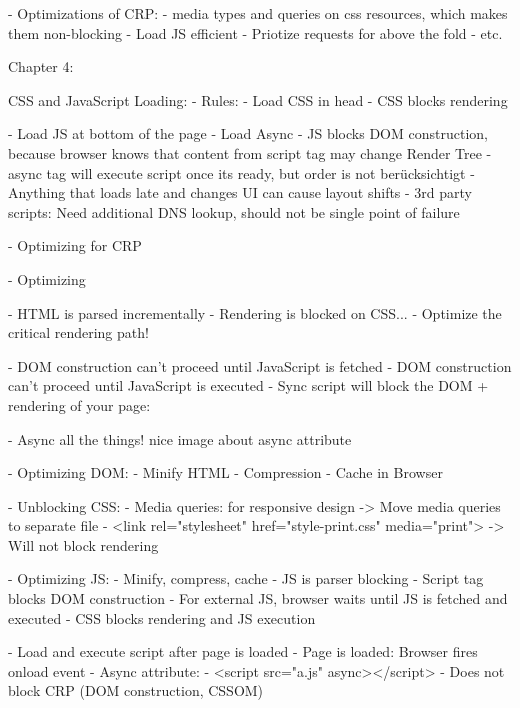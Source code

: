 - Optimizations of CRP:
- media types and queries on css resources, which makes them non-blocking
- Load JS efficient
- Priotize requests for above the fold
- etc. %

Chapter 4:

CSS and JavaScript Loading:
- Rules:
- Load CSS in head
- CSS blocks rendering

- Load JS at bottom of the page
- Load Async
- JS blocks DOM construction, because browser knows that content from script tag may change Render Tree
- async tag will execute script once its ready, but order is not berücksichtigt
- Anything that loads late and changes UI can cause layout shifts
- 3rd party scripts: Need additional DNS lookup, should not be single point of failure


- Optimizing for CRP


- Optimizing


-  HTML is parsed incrementally
- Rendering is blocked on CSS...
- Optimize the critical rendering path!

- DOM construction can't proceed until JavaScript is fetched
- DOM construction can't proceed until JavaScript is executed
- Sync script will block the DOM + rendering of your page:

- Async all the things! nice image about async attribute


- Optimizing DOM:
	- Minify HTML
	- Compression
	- Cache in Browser


- Unblocking CSS:
	- Media queries: for responsive design
	-> Move media queries to separate file
	- <link rel="stylesheet" href="style-print.css" media="print">
	-> Will not block rendering


- Optimizing JS:
	- Minify, compress, cache
	- JS is parser blocking
	- Script tag blocks DOM construction
	- For external JS, browser waits until JS is fetched and executed
	- CSS blocks rendering and JS execution

	- Load and execute script after page is loaded
	- Page is loaded: Browser fires onload event
	- Async attribute:
		- <script src="a.js" async></script>
		- Does not block CRP (DOM construction, CSSOM)

